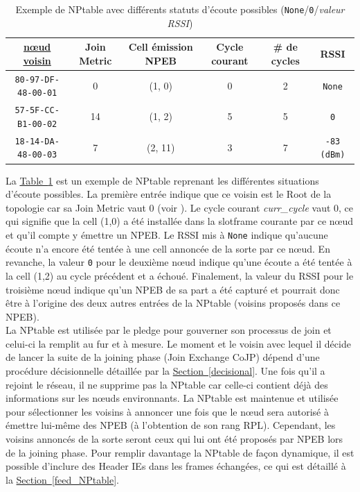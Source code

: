 \documentclass[]{report}
\newcommand{\wordlink}[2]{\hyperref[#2]{#1~\ref{#2}}}
\begin{document}
\begin{table}[h]
\centering
\begin{tabular}{|c|c|c|c|c|c|}
	\hline
    \textbf{\underline{nœud voisin}} & \textbf{Join Metric} & \textbf{Cell émission NPEB} & \textbf{Cycle courant} & \textbf{\# de cycles} & \textbf{RSSI}\\
    \hline
    \texttt{80-97-DF-48-00-01} & 0 & (1, 0) & 0 & 2 & \texttt{None}\\
    \hline
    \texttt{57-5F-CC-B1-00-02} & 14 & (1, 2) & 5 & 5 & \texttt{0}\\
    \hline
    \texttt{18-14-DA-48-00-03} & 7 & (2, 11) & 3 & 7 & \texttt{-83 (dBm)}\\
    \hline
\end{tabular}
\caption{Exemple de NPtable avec différents statuts d'écoute possibles (\texttt{None}/\texttt{0}/\textit{valeur RSSI})}
\label{NPtable}
\end{table}
\vspace{0.5cm}

La \wordlink{Table}{NPtable} est un exemple de NPtable reprenant les différentes situations d'écoute possibles. La première entrée indique que ce voisin est le Root de la topologie car sa Join Metric vaut 0 (voir \cite{rfc8180}). Le cycle courant \textit{curr\_cycle} vaut 0, ce qui signifie que la cell (1,0) a été installée dans la slotframe courante par ce nœud et qu'il compte y émettre un NPEB. Le RSSI mis à \texttt{None} indique qu'aucune écoute n'a encore été tentée à une cell annoncée de la sorte par ce nœud. En revanche, la valeur \texttt{0} pour le deuxième nœud indique qu'une écoute a été tentée à la cell (1,2) au cycle précédent et a échoué. Finalement, la valeur du RSSI pour le troisième nœud indique qu'un NPEB de sa part a été capturé et pourrait donc être à l'origine des deux autres entrées de la NPtable (voisins proposés dans ce NPEB).\\

La NPtable est utilisée par le pledge pour gouverner son processus de join et celui-ci la remplit au fur et à mesure. Le moment et le voisin avec lequel il décide de lancer la suite de la joining phase (Join Exchange CoJP) dépend d'une procédure décisionnelle détaillée par la \wordlink{Section}{decisional}. Une fois qu'il a rejoint le réseau, il ne supprime pas la NPtable car celle-ci contient déjà des informations sur les nœuds environnants. La NPtable est maintenue et utilisée pour sélectionner les voisins à annoncer une fois que le nœud sera autorisé à émettre lui-même des NPEB (à l'obtention de son rang RPL). Cependant, les voisins annoncés de la sorte seront ceux qui lui ont été proposés par NPEB lors de la joining phase. Pour remplir davantage la NPtable de façon dynamique, il est possible d'inclure des Header IEs dans les frames échangées, ce qui est détaillé à la \wordlink{Section}{feed_NPtable}.
\end{document}
